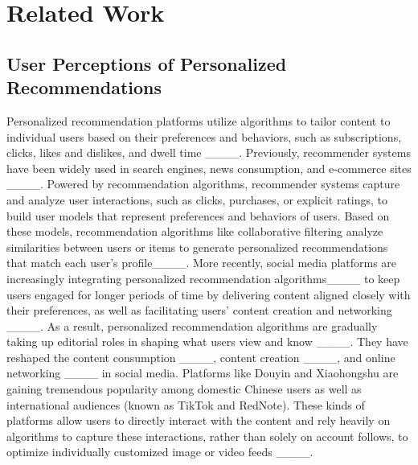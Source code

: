 \section{Related Work}
\subsection{User Perceptions of Personalized Recommendations}

Personalized recommendation platforms utilize algorithms to tailor content to individual users based on their preferences and behaviors, such as subscriptions, clicks, likes and dislikes, and dwell time ____. Previously, recommender systems have been widely used in search engines, news consumption, and e-commerce sites ____. Powered by recommendation algorithms, recommender systems capture and analyze user interactions, such as clicks, purchases, or explicit ratings, to build user models that represent preferences and behaviors of users. Based on these models, recommendation algorithms like collaborative filtering analyze similarities between users or items to generate personalized recommendations that match each user's profile____. More recently, social media platforms are increasingly integrating personalized recommendation algorithms____ to keep users engaged for longer periods of time by delivering content aligned closely with their preferences, as well as facilitating users’ content creation and networking ____. As a result, personalized recommendation algorithms are gradually taking up editorial roles in shaping what users view and know ____. They have reshaped the content consumption ____, content creation ____, and online networking ____ in social media.
Platforms like Douyin and Xiaohongshu are gaining tremendous popularity among domestic Chinese users as well as international audiences (known as TikTok and RedNote). These kinds of platforms allow users to directly interact with the content and rely heavily on algorithms to capture these interactions, rather than solely on account follows, to optimize individually customized image or video feeds ____. 

